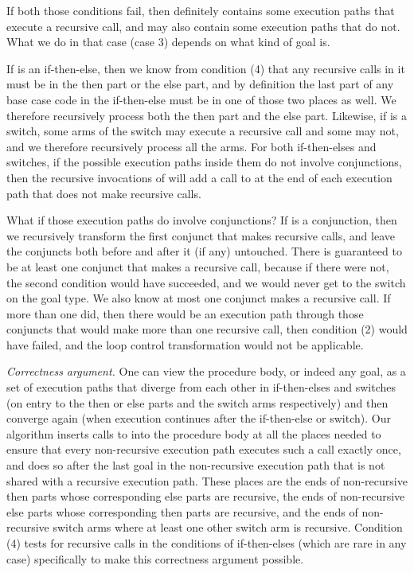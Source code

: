 If both those conditions fail,
then 
definitely contains some execution paths that execute a recursive call,
and may also contain some execution paths that do not.
What we do in that case (case 3)
depends on what kind of goal  is.

If  is an if-then-else,
then we know from condition (4)
that any recursive calls in it
must be in the then part or the else part,
and by definition the last part of any base case code
in the if-then-else must be in one of those two places as well.
We therefore recursively process both the then part and the else part.
Likewise, if  is a switch,
some arms of the switch may execute a recursive call and some may not,
and we therefore recursively process all the arms.
For both if-then-elses and switches,
if the possible execution paths inside them do not involve conjunctions,
then the recursive invocations of \putbarriers
will add a call to \lcfinish at
the end of each execution path that does not make recursive calls.

What if those execution paths do involve conjunctions?
If  is a conjunction,
then we recursively transform the first conjunct that makes recursive calls,
and leave the conjuncts both before and after it (if any) untouched.
There is guaranteed to be at least one conjunct that makes a recursive call,
because if there were not, the second condition would have succeeded,
and we would never get to the switch on the goal type.
We also know at most one conjunct makes a recursive call.
If more than one did, then
there would be an execution path through those conjuncts
that would make more than one recursive call,
then condition (2) would have failed,
and the loop control transformation would not be applicable.

\emph{Correctness argument.}
One can view the procedure body, or indeed any goal,
as a set of execution paths that
diverge from each other
in if-then-elses and switches
(on entry to the then or else parts and the switch arms respectively)
and then converge again
(when execution continues after the if-then-else or switch).
Our algorithm inserts calls to \lcfinish into the procedure body
at all the places needed to ensure
that every non-recursive execution path executes such a call exactly once,
and does so after the last goal in the non-recursive execution path
that is not shared with a recursive execution path.
These places are
the ends of non-recursive then parts
whose corresponding else parts are recursive,
the ends of non-recursive else parts
whose corresponding then parts are recursive,
and the ends of non-recursive switch arms
where at least one other switch arm is recursive.
Condition (4) tests for recursive calls in the conditions of if-then-elses
(which are rare in any case)
specifically to make this correctness argument possible.

